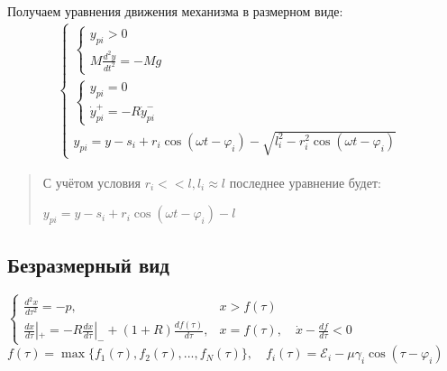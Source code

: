 Получаем уравнения движения механизма в размерном виде:
\Large
\begin{align*}
\left\{
\begin{array}{ll}
\left\{
\begin{array}{l}
y_{pi} > 0 \\
M \frac{d^2 y}{dt^2} = -Mg
\end{array}
\right. & \\[2mm]
\left\{
\begin{array}{l}
y_{pi} = 0 \\
\dot{y}_{pi}^+ = -R \dot{y}_{pi}^-
\end{array}
\right. & \\[2mm]
y_{pi} = y - s_i + r_i \cos(\omega t - \varphi_i) - \sqrt{l_i^2 - r_i^2 \cos(\omega t - \varphi_i)}
\end{array}
\right.
\end{align*}
\normalsize

\begin{quotation}
С учётом условия $r_i << l, l_i \approx l$ последнее уравнение будет: 

\centering$y_{pi} = y - s_i + r_i \cos(\omega t - \varphi_i) - l$
\end{quotation}

\subsection{Безразмерный вид}

\Large
$
\begin{cases}
\frac{{d^2 x}}{{d \tau^2}} = -p, & x > f(\tau) \\[2mm]
\frac{{dx}}{{d\tau}}|_+ = -R \frac{{dx}}{{d\tau}}|_- + (1 + R) \frac{{df(\tau)}}{{d\tau}}, & x = f(\tau), \quad \dot{x} - \frac{{df}}{{d\tau}} < 0
\end{cases}
$
\\[8mm]
\large
{
$
f(\tau) = \max\{f_1(\tau), f_2(\tau), ..., f_N(\tau)\},\quad f_i(\tau) = \mathcal{E}_i - \mu \gamma_i \cos(\tau - \varphi_i)
$
}
\normalsize